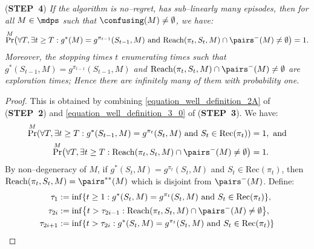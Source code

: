 \documentclass[preprint,cleveref,12pt]{colt2025}
\DeclarePairedDelimiter{\braces}{\{}{\}}	%
\DeclarePairedDelimiter{\parens}{(}{)}	%
\def\models{\mdps}
\def\Reach{\mathrm{Reach}}
\def\STEP#1{(\strong{STEP~#1})}
\newcommand{\strong}[1]{\textbf{#1}}
\begin{document}
    \noindent
    \STEP{4}
    \textit{
        If the algorithm is no--regret, has sub--linearly many episodes, then for all $M \in \models$ such that $\confusing(M) \ne \emptyset$, we have:
        \begin{equation}
            \Pr^M \parens*{
                \forall T, \exists t \ge T:
                g^*(M) = g^{\pi_{t-1}}(S_{t-1}, M)
                \text{~and~}
                \Reach(\pi_t, S_t, M) \cap \pairs^{-}(M) \ne \emptyset
            } = 1.
        \end{equation}
        Moreover, the stopping times $t$ enumerating times such that $g^*(S_{t-1}, M) = g^{\pi_{t-1}}(S_{t-1}, M)$ and $\Reach(\pi_t, S_t, M) \cap \pairs^-(M) \ne \emptyset$ are exploration times; Hence there are infinitely many of them with probability one.
    }
    \medskip
    \begin{proof}
        This is obtained by combining \eqref{equation_well_definition_2A} of \STEP{2} and \eqref{equation_well_definition_3_0} of \STEP{3}.
        We have:
        \begin{align}
        \label{equation_well_definition_4B}
            \Pr^M \parens*{
                \forall T, \exists t \ge T:
                g^*(S_{t-1},M) = g^{\pi_t}(S_t, M)
                \text{~and~}
                S_t \in \mathrm{Rec}(\pi_t)
            } & = 1, \text{~and}
            \\
        \label{equation_well_definition_4C}
            \Pr^M \parens*{
                \forall T, \exists t \ge T:
                \Reach(\pi_t, S_t, M) \cap \pairs^-(M) \ne \emptyset
            }
            & = 1
            .
        \end{align}
        By non--degeneracy of $M$, if $g^*(S_t, M) = g^{\pi_t}(S_t, M)$ and $S_t \in \mathrm{Rec}(\pi_t)$, then $\Reach(\pi_t, S_t, M) = \pairs^{**}(M)$ which is disjoint from $\pairs^-(M)$. 
        Define:
        \begin{align*}
            \tau_1 
            & := \inf \braces*{
                t \ge 1 : 
                g^*(S_t, M) = g^{\pi_t}(S_t, M) \text{~and~} S_t \in \mathrm{Rec}(\pi_t)
            }
            ,
            \\
            \tau_{2i}
            & := \inf \braces*{
                t > \tau_{2i-1}: 
                \Reach(\pi_t, S_t, M) \cap \pairs^-(M) \ne \emptyset
            }
            , 
            \\
            \tau_{2i+1}
            & := \inf \braces*{
                t > \tau_{2i} : 
                g^*(S_t, M) = g^{\pi_t}(S_t, M) \text{~and~} S_t \in \mathrm{Rec}(\pi_t)
}
\end{align*}
\end{proof}
\end{document}
